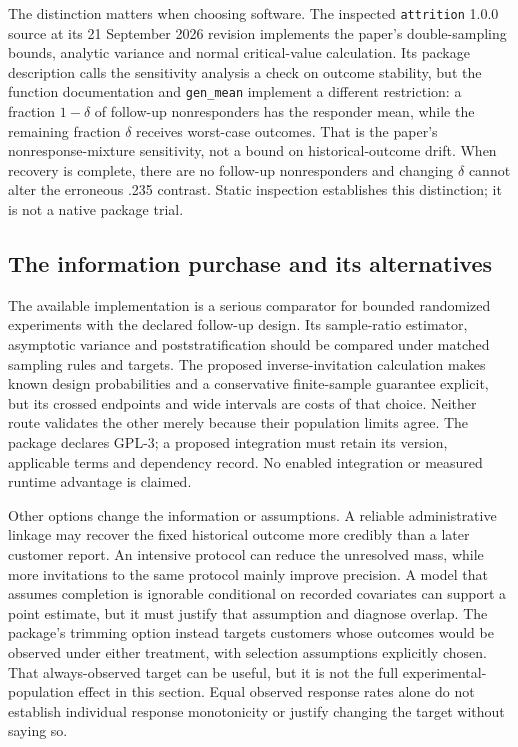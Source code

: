 The distinction matters when choosing software. The inspected
\texttt{attrition} 1.0.0 source at its 21 September 2026 revision implements
the paper's double-sampling bounds, analytic variance and normal critical-value
calculation. Its package description calls the sensitivity analysis a check
on outcome stability, but the function documentation and
\texttt{gen\_mean} implement a different restriction: a fraction $1-\delta$
of follow-up nonresponders has the responder mean, while the remaining
fraction $\delta$ receives worst-case outcomes. That is the paper's
nonresponse-mixture sensitivity, not a bound on historical-outcome drift.
When recovery is complete, there are no follow-up nonresponders and changing
$\delta$ cannot alter the erroneous .235 contrast. Static inspection
establishes this distinction; it is not a native package trial.
\citep{rel73attrition,rel73coppock2017}

\subsection{The information purchase and its alternatives}

The available implementation is a serious comparator for bounded randomized
experiments with the declared follow-up design. Its sample-ratio estimator,
asymptotic variance and poststratification should be compared under matched
sampling rules and targets. The proposed inverse-invitation calculation makes
known design probabilities and a conservative finite-sample guarantee explicit,
but its crossed endpoints and wide intervals are costs of that choice. Neither
route validates the other merely because their population limits agree.
The package declares GPL-3; a proposed integration must retain its version,
applicable terms and dependency record. No enabled integration or measured
runtime advantage is claimed. \citep{rel73attrition}

Other options change the information or assumptions. A reliable administrative
linkage may recover the fixed historical outcome more credibly than a later
customer report. An intensive protocol can reduce the unresolved mass, while
more invitations to the same protocol mainly improve precision. A model that
assumes completion is ignorable conditional on recorded covariates can support
a point estimate, but it must justify that assumption and diagnose overlap.
The package's trimming option instead targets customers whose outcomes would
be observed under either treatment, with selection assumptions explicitly
chosen. That always-observed target can be useful, but it is not the full
experimental-population effect in this section. Equal observed response rates
alone do not establish individual response monotonicity or justify changing
the target without saying so. \citep{rel73attrition}


